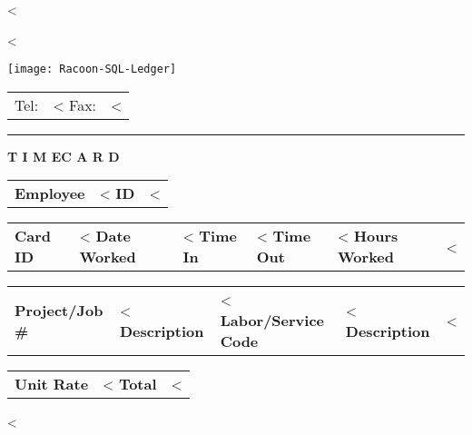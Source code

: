 \documentclass{scrartcl}
\begin{document}
\pagestyle{myheadings}
\thispagestyle{empty}

\fontsize{10pt}{12pt}\selectfont

\vspace*{-1.3cm}

\parbox{\textwidth}{%
  \parbox[b]{.42\textwidth}{%
    <%
   
    <%
  }
  \parbox[b]{.2\textwidth}{
    \texttt{[image: Racoon-SQL-Ledger]}
  }\hfill
  \begin{tabular}[b]{rr@{}}
  Tel: & <%
  Fax: & <%
  \end{tabular}

  \rule[1.5em]{\textwidth}{0.5pt}
}

\centerline{\textbf{T I M E}\hspace{0.5cm}\textbf{C A R D}}

\vspace*{0.5cm}

\begin{tabular}[t]{ll}
  \textbf{Employee} & <%
  \textbf{ID} & <%
\end{tabular}
\hfill
\begin{tabular}[t]{ll}
  \textbf{Card ID} & <%
  \textbf{Date Worked} & <%
  \textbf{Time In} & <%
  \textbf{Time Out} & <%
  \textbf{Hours Worked} & <%
\end{tabular}

\vspace{1cm}

\begin{tabular}[b]{ll}
  \textbf{Project/Job \#} & <%
  \textbf{Description} & <%
  \textbf{Labor/Service Code} & <%
  \textbf{Description} & <%
\end{tabular}
\hfill
\begin{tabular}[b]{lr}
  \textbf{Unit Rate} & <%
  \textbf{Total} & <%
\end{tabular}
  
\vspace{0.3cm}

<%
 
\end{document}
